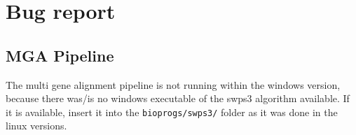 \documentclass{scrartcl}
\begin{document}
	\section{Bug report}
	\subsection{MGA Pipeline}
		The multi gene alignment pipeline is not running within the windows version, because there was/is no windows executable of the swps3 algorithm available. If it is available, insert it into the \texttt{bioprogs/swps3/} folder as it was done in the linux versions.
\end{document}
